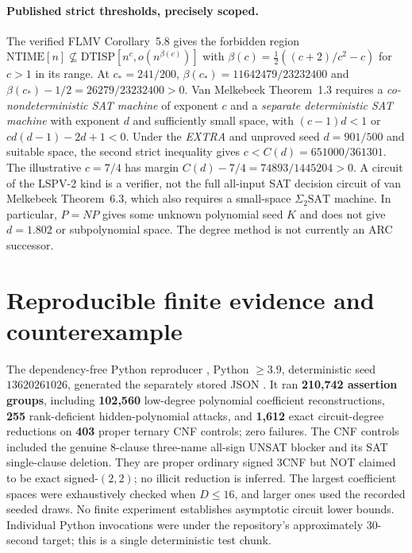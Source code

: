 \documentclass[11pt]{article}
\begin{document}
\paragraph{Published strict thresholds, precisely scoped.} The verified FLMV Corollary~5.8 gives the forbidden region $\mathrm{NTIME}[n]\not\subseteq\mathrm{DTISP}[n^c,o(n^{\beta(c)})]$ with $\beta(c)=\frac12((c+2)/c^2-c)$ for $c>1$ in its range. At $c_*=241/200$, $\beta(c_*)=11642479/23232400$ and $\beta(c_*)-1/2=26279/23232400>0$. Van Melkebeek Theorem~1.3 requires a \emph{co-nondeterministic SAT machine} of exponent $c$ and a \emph{separate deterministic SAT machine} with exponent $d$ and sufficiently small space, with $(c-1)d<1$ or $cd(d-1)-2d+1<0$. Under the \emph{EXTRA} and unproved seed $d=901/500$ and suitable space, the second strict inequality gives $c<C(d)=651000/361301$. The illustrative $c=7/4$ has margin $C(d)-7/4=74893/1445204>0$. A circuit of the LSPV-2 kind is a verifier, not the full all-input SAT decision circuit of van Melkebeek Theorem~6.3, which also requires a small-space $\Sigma_2\mathrm{SAT}$ machine. In particular, $P=NP$ gives some unknown polynomial seed $K$ and does not give $d=1.802$ or subpolynomial space. The degree method is not currently an ARC successor.

\section{Reproducible finite evidence and counterexample}
The dependency-free Python reproducer , Python $\ge3.9$, deterministic seed $13620261026$, generated the separately stored JSON . It ran \textbf{210,742 assertion groups}, including \textbf{102,560} low-degree polynomial coefficient reconstructions, \textbf{255} rank-deficient hidden-polynomial attacks, and \textbf{1,612} exact circuit-degree reductions on \textbf{403} proper ternary CNF controls; zero failures. The CNF controls included the genuine $8$-clause three-name all-sign UNSAT blocker and its SAT single-clause deletion. They are proper ordinary signed 3CNF but NOT claimed to be exact signed-$(2,2)$; no illicit reduction is inferred. The largest coefficient spaces were exhaustively checked when $D\le16$, and larger ones used the recorded seeded draws. No finite experiment establishes asymptotic circuit lower bounds. Individual Python invocations were under the repository's approximately 30-second target; this is a single deterministic test chunk.
\end{document}
